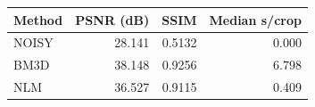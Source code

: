 \begin{tabular}{lrrr}
\toprule
Method & PSNR (dB) & SSIM & Median s/crop \\
\midrule
NOISY & 28.141 & 0.5132 & 0.000 \\
BM3D & 38.148 & 0.9256 & 6.798 \\
NLM & 36.527 & 0.9115 & 0.409 \\
\bottomrule
\end{tabular}
